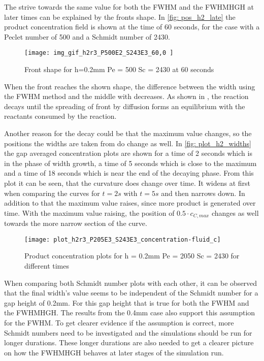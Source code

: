 \documentclass[../thesis.tex]{subfiles}
\begin{document}
The strive towards the same value for both the FWHM and the FWHMHGH at later times can be explained by the fronts shape. In \autoref{fig: pos_h2_late} the product concentration field is shown at the time of 60 seconds, for the case with a Peclet number of 500 and a Schmidt number of 2430.
\begin{figure}[htb]
	\centering
	\texttt{[image: img\_gif\_h2r3\_P500E2\_S243E3\_60,0 ]}
	\caption{Front shape for h=0.2mm Pe = 500 Sc = 2430 at 60 seconds}
	\label{fig: pos_h2_late}
\end{figure}
When the front reaches the shown shape, the difference between the width using the FWHM method and the middle with decreases. As shown in \cite{comolli2021dynamics}, the reaction decays until the spreading of front by diffusion forms an equilibrium with the reactants consumed by the reaction.

Another reason for the decay could be that the maximum value changes, so the positions the widths are taken from do change as well. In \autoref{fig: plot_h2_widths} the gap averaged concentration plots are shown for a time of 2 seconds which is in the phase of width growth, a time of 5 seconds which is close to the maximum and a time of 18 seconds which is near the end of the decaying phase. From this plot it can be seen, that the curvature does change over time. It widens at first when comparing the curves for $t = 2s$ with $t = 5s$ and then narrows down. In addition to that the maximum value raises, since more product is generated over time. With the maximum value raising, the position of $0\text{.}5 \cdot c_{C,max}$ changes as well towards the more narrow section of the curve. 
\begin{figure}
	\centering
	\texttt{[image: plot\_h2r3\_P205E3\_S243E3\_concentration-fluid\_c]}
	\caption{Product concentration plots for h = 0.2mm  Pe = 2050 Sc = 2430 for different times}
	\label{fig: plot_h2_widths}
\end{figure}

When comparing both Schmidt number plots with each other, it can be observed that the final width's value seems to be independent of the Schmidt number for a gap height of 0.2mm. For this gap height that is true for both the FWHM and the  FWHMHGH. The results from the 0.4mm case also support this assumption for the FWHM. To get clearer evidence if the assumption is correct, more Schmidt numbers need to be investigated and the simulations should be run for longer durations. These longer durations are also needed to get a clearer picture on how the FWHMHGH behaves at later stages of the simulation run.
\end{document}
